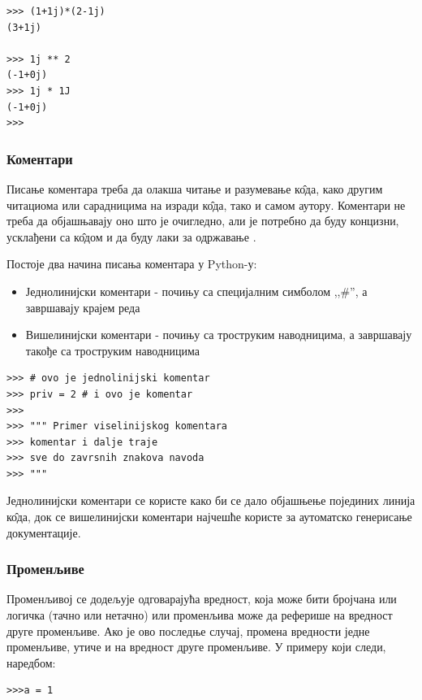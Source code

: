 \begin{lstlisting}[caption = Операције са комплексним бројевима, label = kompleksni]
>>> (1+1j)*(2-1j)
(3+1j)

>>> 1j ** 2
(-1+0j)
>>> 1j * 1J
(-1+0j)
>>>
\end{lstlisting}

\subsubsection{Коментари}

Писање коментара треба да олакша читање и разумевање к\^{о}да, како другим читациома или сарадницима на изради к\^{о}да, тако и самом аутору. Коментари не треба да објашњавају оно што је очигледно, али је потребно да буду концизни, усклађени са к\^{о}дом и да буду лаки за одржавање \cite{maric}.

Постоје два начина писања коментара у Python-у:

\begin{itemize}
\item Једнолинијски коментари - почињу са специјалним симболом ,,\#'', а завршавају крајем реда
\item Вишелинијски коментари - почињу са троструким наводницима, а завршавају такође са троструким наводницима
\end{itemize}

\begin{lstlisting}[caption = Писање коментара, label = komentari]
>>> # ovo je jednolinijski komentar
>>> priv = 2 # i ovo je komentar
>>>
>>> """ Primer viselinijskog komentara
>>> komentar i dalje traje
>>> sve do zavrsnih znakova navoda
>>> """
\end{lstlisting}

Једнолинијски коментари се користе како би се дало објашњење појединих линија к\^{о}да, док се вишелинијски коментари најчешће користе за аутоматско генерисање документације.

\subsubsection{Променљиве}

Променљивој се додељује одговарајућа вредност, која може бити бројчана или логичка (тачно или нетачно) или променљива може да реферише на вредност друге променљиве. Ако је ово последње случај, промена вредности једне променљиве, утиче и на вредност друге променљиве. У примеру који следи, наредбом:

\begin{lstlisting}
>>>a = 1
\end{lstlisting}

